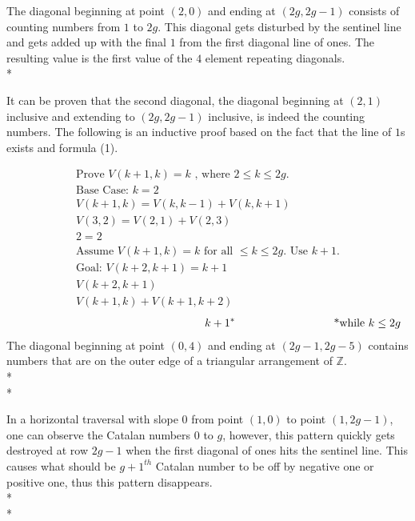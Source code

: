 \documentclass{article}
\newcommand*{\set}[1]{\mathbb{#1}}
\newcommand\tab[1][1cm]{\hspace*{#1}}
\begin{document}
The diagonal beginning at point $(2, 0)$ and ending at $(2g, 2g-1)$ consists of counting numbers from $1$ to $2g$. This diagonal gets
disturbed by the sentinel line and gets added up with the final $1$ from the first diagonal line of ones. The resulting value
is the first value of the $4$ element repeating diagonals.\\*
 
It can be proven that the second diagonal, the diagonal beginning at $(2,1)$ inclusive and extending to $(2g, 2g-1)$ inclusive, is indeed the counting numbers. The following is an inductive proof based on the fact that the line of $1$s exists and formula (1).

\begin{gather*}
\text{Prove   } V(k+1, k) = k\text{ , where } 2 \leq k \leq 2g\text{.} \\
\text{Base Case: }k = 2\\
V(k+1,k) = V(k,k-1) + V(k,k+1)\\
V(3,2) = V(2,1) + V(2,3)\\
2 = 2\\
\text{Assume } V(k+1, k) = k \text{ for all } \leq k \leq 2g \text{. }
\text{Use } k+1 \text{.}\\
\text{Goal: } V(k+2, k+1) = k + 1\\
V(k+2,k+1)\\
V(k+1,k) + V(k+1, k+2)
\end{gather*}
\begin{align}
\tab\tab\tab\tab\tab\tab k + 1^* \tab\tab\tab \text{ *while } k \leq 2g
\end{align}
\newline \newline
The diagonal beginning at point $(0,4)$ and ending at $(2g-1, 2g-5)$ contains numbers that are on the outer edge of a triangular
arrangement of $\set{Z}$.\\*\\*

\tab In a horizontal traversal with slope $0$ from point $(1, 0)$ to point $(1, 2g-1)$, one can observe the Catalan numbers $0$ to $g$,
 however, this pattern quickly gets destroyed at row $2g-1$ when the first diagonal of ones hits the sentinel line. This causes
 what should be $g+1^{th}$ Catalan number to be off by negative one or positive one, thus this pattern disappears.\\*\\*
 
\end{document}
